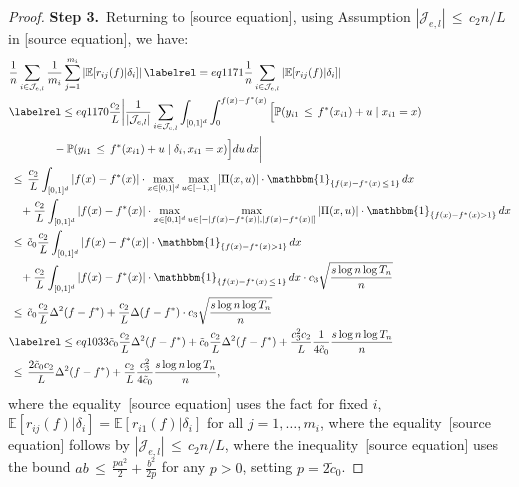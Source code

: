 \documentclass[twoside,11pt]{article}
\makeatletter
\newcommand{\discardlabel}[1]{}
\newcommand{\discardtwo}[2]{}
\newcommand{\legacyref}[1]{\textup{[source ref.]}}
\newcommand{\legacyeqref}[1]{\textup{[source equation]}}
\newenvironment{legacycomparison}{%
  \begingroup\color{legacygray}%
  \let\label\discardlabel
  \let\originallabel\discardlabel
  \let\ref\legacyref
  \let\pageref\legacyref
  \let\eqref\legacyeqref
  \let\cref\legacyref
  \let\Cref\legacyref
  \let\autoref\legacyref
  \let\aliasref\discardtwo
}{\endgroup}
\newcommand{\aliasref}[2]{%
  \@ifundefined{r@#2}{}{%
    \expandafter\let\csname r@#1\expandafter\endcsname\csname r@#2\endcsname}}
\makeatother
\begin{document}
\begin{legacycomparison}
\begin{proof}
\par\medskip\noindent\textbf{Step 3.}\ 
Returning to \eqref{blk_856}, using Assumption $|\mathcal{J}_{e,l}| \,\leq\, c_2 n/L$ in \eqref{beta_constants}, we have:
\begin{align*}
    &\frac{1}{n}\sum_{i \in \mathcal{J}_{e,l}} \frac{1}{m_i}\sum_{j=1}^{m_{i}}\left|\mathbb{E}[r_{ij}(f)|\delta_i]\right| \labelrel={eq1171} \frac{1}{n}\sum_{i \in \mathcal{J}_{e,l}} \left|\mathbb{E}[r_{ij}(f)|\delta_i]\right|  \\
    & \labelrel\leq{eq1170} \frac{c_2}{L}\bigg| \frac{1}{|\mathcal{J}_{e,l}|} \sum_{i\in \mathcal{J}_{e,l}} \int_{[0,1]^d}\int_0^{f(x) - f^*(x)} \Big[ \mathbb{P}(y_{i1} \,\leq\, f^*(x_{i1}) + u \mid x_{i1}=x) \\
    &\qquad\qquad - \mathbb{P}(y_{i1} \,\leq\, f^*(x_{i1}) + u \mid \delta_i, x_{i1} = x) \Big] du \, dx \bigg| \\
    &\,\leq\, \frac{c_2}{L}\int_{[0,1]^d} \left| f(x) - f^*(x) \right| \cdot \max_{x\in[0,1]^d}\max_{u \in [-1,1]} |\Pi(x,u)| \cdot \mathbbm{1}_{\{f(x) - f^*(x) \,\leq\, 1\}} \, dx \\
    &\quad + \frac{c_2}{L}\int_{[0,1]^d} \left| f(x) - f^*(x) \right| \cdot \max_{x\in[0,1]^d}\max_{u \in [-|f(x) - f^*(x)|, |f(x) - f^*(x)|]}|\Pi(x,u)| \cdot \mathbbm{1}_{\{f(x) - f^*(x) > 1\}} \, dx \\
    &\,\leq\, \tilde c_0 \frac{c_2}{L}\int_{[0,1]^d} \left| f(x) - f^*(x) \right| \cdot \mathbbm{1}_{\{f(x) - f^*(x) > 1\}} \, dx \\
    &\quad + \frac{c_2}{L}\int_{[0,1]^d} \left| f(x) - f^*(x) \right| \cdot \mathbbm{1}_{\{f(x) - f^*(x) \,\leq\, 1\}} \, dx \cdot c_3\sqrt{\frac{s\log n \log T_n}{n}} \\
    &\,\leq\, \tilde c_0 \frac{c_2}{L} \Delta^2(f-f^*) + \frac{c_2}{L}\Delta(f-f^*)\cdot c_3\sqrt{\frac{s\log n \log T_n}{n}} \\
    & \labelrel\leq{eq1033}  \tilde c_0\frac{c_2}{L}  \Delta^2(f-f^*) + \tilde c_0 \frac{c_2}{L}\Delta^2(f-f^*)+ \frac{c_3^2c_2}{L}\frac{1}{4\tilde c_0}\frac{s\log n\log T_n}{n}  \\
&\,\leq\, \frac{2\tilde c_0c_2}{L}  \Delta^2(f-f^*)+ \frac{c_2}{L}\frac{c_3^2}{4\tilde c_0}\frac{s\log n\log T_n}{n},
\end{align*}
where the equality~\eqref{eq1171} uses the fact for fixed $i$, $\mathbb{E}[r_{ij}(f)|\delta_i] = \mathbb{E}[r_{i1}(f)|\delta_i]$ for all $j=1, \dots, m_i$, where the equality~\eqref{eq1170} follows by $|\mathcal{J}_{e,l}| \,\leq\, c_2 n/L$, 
where the inequality~\eqref{eq1033} uses the bound $ab \,\leq\,  \frac{pa^2}{2} + \frac{b^2}{2p}$ for any $p > 0$, setting $p = 2\tilde c_0$.


\end{proof}
\end{legacycomparison}
\end{document}
